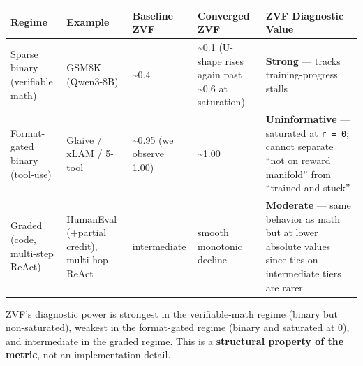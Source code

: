\documentclass[
  american,
  11pt,
  a4paper,
  oneside]{report}
\newcounter{none} %
\begin{document}
{\def\LTcaptype{none} %
\begin{longtable}[]{@{}
  >{\raggedright\arraybackslash}p{}
  >{\raggedright\arraybackslash}p{}
  >{\raggedright\arraybackslash}p{}
  >{\raggedright\arraybackslash}p{}
  >{\raggedright\arraybackslash}p{}@{}}
\toprule\noalign{}
\begin{minipage}[b]{\linewidth}\raggedright
Regime
\end{minipage} & \begin{minipage}[b]{\linewidth}\raggedright
Example
\end{minipage} & \begin{minipage}[b]{\linewidth}\raggedright
Baseline ZVF
\end{minipage} & \begin{minipage}[b]{\linewidth}\raggedright
Converged ZVF
\end{minipage} & \begin{minipage}[b]{\linewidth}\raggedright
ZVF Diagnostic Value
\end{minipage} \\
\midrule\noalign{}
\endhead
\bottomrule\noalign{}
\endlastfoot
Sparse binary (verifiable math) & GSM8K (Qwen3-8B) & \textasciitilde0.4
& \textasciitilde0.1 (U-shape rises again past \textasciitilde0.6 at
saturation) & \textbf{Strong} --- tracks training-progress stalls \\
Format-gated binary (tool-use) & Glaive / xLAM / 5-tool &
\textasciitilde0.95 (we observe 1.00) & \textasciitilde1.00 &
\textbf{Uninformative} --- saturated at \texttt{r\ =\ 0}; cannot
separate ``not on reward manifold'' from ``trained and stuck'' \\
Graded (code, multi-step ReAct) & HumanEval (+partial credit), multi-hop
ReAct & intermediate & smooth monotonic decline & \textbf{Moderate} ---
same behavior as math but at lower absolute values since ties on
intermediate tiers are rarer \\
\end{longtable}
}

ZVF's diagnostic power is strongest in the verifiable-math regime
(binary but non-saturated), weakest in the format-gated regime (binary
and saturated at 0), and intermediate in the graded regime. This is a
\textbf{structural property of the metric}, not an implementation
detail.
\end{document}
